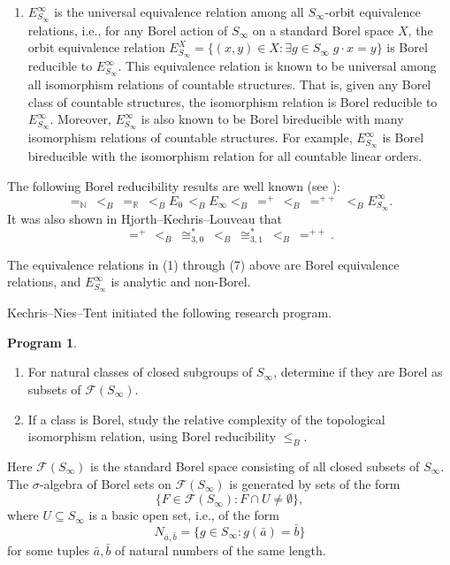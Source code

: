 \documentclass{amsart}
\theoremstyle{definition}
\newtheorem*{programme}{Program}
\theoremstyle{remark}
\begin{document}
\begin{enumerate}
\item $E^\infty_{S_\infty}$ is the universal equivalence relation among all $S_\infty$-orbit equivalence relations, i.e., for any Borel action of $S_\infty$ on a standard Borel space $X$, the orbit equivalence relation $E^X_{S_\infty}=\{(x,y)\in X\colon \exists g\in S_\infty\; g\cdot x=y\}$ 
is Borel reducible to $E^\infty_{S_\infty}$. This equivalence relation is known to be universal among all isomorphism relations of countable structures. That is, given any Borel class of countable structures, the isomorphism relation is Borel reducible to $E^\infty_{S_\infty}$. Moreover, $E^\infty_{S_\infty}$ is also known to be Borel bireducible with many isomorphism relations of countable structures. For example, $E^\infty_{S_\infty}$ is Borel bireducible with the isomorphism relation for all countable linear orders. 
\end{enumerate}

The following Borel reducibility results are well known (see \cite{GaoBook}):
$$ =_{\mathbb{N}}\ <_B\  =_{\mathbb{R}}\ <_B   E_0\, <_B E_\infty  <_B\  =^+\, <_B\  =^{++}\ <_B E^\infty_{S_\infty}. $$
It was also shown in Hjorth--Kechris--Louveau \cite{HKL} that
$$ =^+\,<_B\  \cong^*_{3,0}\ <_B\  \cong^*_{3,1}\ <_B\  =^{++}. $$

The equivalence relations in (1) through (7) above are Borel equivalence relations, and $E^\infty_{S_\infty}$ is analytic and non-Borel. 

Kechris--Nies--Tent \cite{KNT} initiated the following research program.

 \begin{programme}{\ }
        \begin{enumerate}
            \item For natural classes of closed subgroups of $S_\infty$, determine if they are Borel as subsets of $\mathcal{F}(S_\infty)$. 
            \item If a class is Borel, study the relative complexity of the topological isomorphism relation, using Borel reducibility $\leq_B$. 
        \end{enumerate}
     \end{programme}

Here $\mathcal{F}(S_\infty)$ is the standard Borel space consisting of all closed subsets of $S_\infty$. The $\sigma$-algebra of Borel sets on $\mathcal{F}(S_\infty)$ is generated by sets of the form 
$$\{F\in \mathcal{F}(S_\infty)\colon F \cap U \neq \emptyset\}, $$ where $U\subseteq S_\infty$ is a basic open set, i.e., of the form 
$$N_{\bar{a},\bar{b}}=\{g\in S_\infty\colon g(\bar{a})=\bar{b}\} $$
for some tuples $\bar{a}, \bar{b}$ of natural numbers of the same length. 
\end{document}
